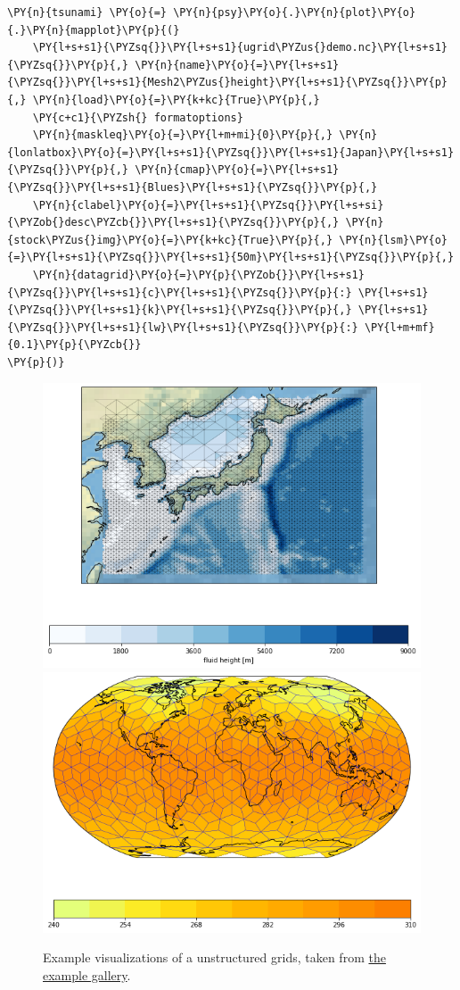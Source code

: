 \documentclass[
11pt, %
english, %
singlespacing, %
headsepline, %
]{article} %
\begin{document}
\begin{refsection}
\begin{Verbatim}[commandchars=\\\{\}]
\PY{n}{tsunami} \PY{o}{=} \PY{n}{psy}\PY{o}{.}\PY{n}{plot}\PY{o}{.}\PY{n}{mapplot}\PY{p}{(}
    \PY{l+s+s1}{\PYZsq{}}\PY{l+s+s1}{ugrid\PYZus{}demo.nc}\PY{l+s+s1}{\PYZsq{}}\PY{p}{,} \PY{n}{name}\PY{o}{=}\PY{l+s+s1}{\PYZsq{}}\PY{l+s+s1}{Mesh2\PYZus{}height}\PY{l+s+s1}{\PYZsq{}}\PY{p}{,} \PY{n}{load}\PY{o}{=}\PY{k+kc}{True}\PY{p}{,}
    \PY{c+c1}{\PYZsh{} formatoptions}
    \PY{n}{maskleq}\PY{o}{=}\PY{l+m+mi}{0}\PY{p}{,} \PY{n}{lonlatbox}\PY{o}{=}\PY{l+s+s1}{\PYZsq{}}\PY{l+s+s1}{Japan}\PY{l+s+s1}{\PYZsq{}}\PY{p}{,} \PY{n}{cmap}\PY{o}{=}\PY{l+s+s1}{\PYZsq{}}\PY{l+s+s1}{Blues}\PY{l+s+s1}{\PYZsq{}}\PY{p}{,} 
    \PY{n}{clabel}\PY{o}{=}\PY{l+s+s1}{\PYZsq{}}\PY{l+s+si}{\PYZob{}desc\PYZcb{}}\PY{l+s+s1}{\PYZsq{}}\PY{p}{,} \PY{n}{stock\PYZus{}img}\PY{o}{=}\PY{k+kc}{True}\PY{p}{,} \PY{n}{lsm}\PY{o}{=}\PY{l+s+s1}{\PYZsq{}}\PY{l+s+s1}{50m}\PY{l+s+s1}{\PYZsq{}}\PY{p}{,}
    \PY{n}{datagrid}\PY{o}{=}\PY{p}{\PYZob{}}\PY{l+s+s1}{\PYZsq{}}\PY{l+s+s1}{c}\PY{l+s+s1}{\PYZsq{}}\PY{p}{:} \PY{l+s+s1}{\PYZsq{}}\PY{l+s+s1}{k}\PY{l+s+s1}{\PYZsq{}}\PY{p}{,} \PY{l+s+s1}{\PYZsq{}}\PY{l+s+s1}{lw}\PY{l+s+s1}{\PYZsq{}}\PY{p}{:} \PY{l+m+mf}{0.1}\PY{p}{\PYZcb{}}
\PY{p}{)}
\end{Verbatim}


\begin{figure}
    \centering
    \includegraphics[width=0.45\linewidth]{campussource-figures/maps_example_ugrid_7_0.png}
    \includegraphics[width=0.45\linewidth]{campussource-figures/maps_example_ugrid_18_0.png}
    \caption{Example visualizations of a unstructured grids, taken from \href{https://psyplot.github.io/examples/maps/example_ugrid.html}{the example gallery}.}
    \label{fig:unstructured-example}
\end{figure}


\end{refsection}
\end{document}
